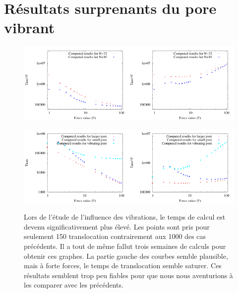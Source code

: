 \documentclass[a4paper,11pt]{article}
\begin{document}
\section*{Résultats surprenants du pore vibrant}


\begin{figure}[H]
\begin{center}
\includegraphics[width=0.5\textwidth]{translocvibf.pdf}\includegraphics[width=0.5\textwidth]{translocvib.pdf}

\includegraphics[width=0.5\textwidth]{translocporedifnbackup.pdf}\includegraphics[width=0.5\textwidth]{translocporedifbackup.pdf}
\caption{Lors de l'étude de l'influence des vibrations, le temps de calcul est devenu significativement plus élevé. Les points sont pris pour seulement 150 translocation contrairement aux 1000 des cas précédents. Il a tout de même fallut trois semaines de calculs pour obtenir ces graphes. La partie gauche des courbes semble plausible, mais à forte forces, le temps de translocation semble saturer. Ces résultats semblent trop peu fiables pour que nous nous aventurions à les comparer avec les précédents.}
\label{surprise}
\end{center}
\end{figure}
\end{document}
